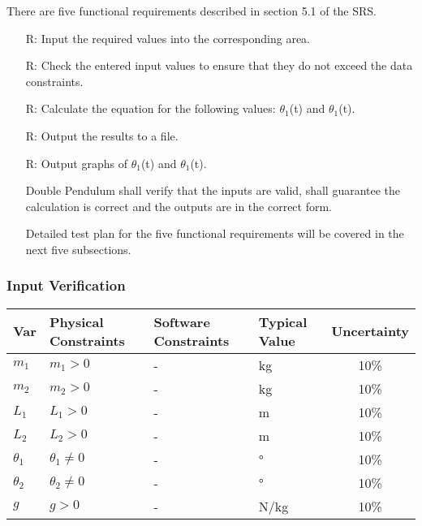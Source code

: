 \documentclass[12pt, titlepage]{article}
\newcounter{reqnum} %
\begin{document}
There are five functional requirements described in section 5.1 of the SRS. 

\noindent \begin{itemize}

\item[R\refstepcounter{reqnum}\thereqnum \label{R_Inputs}:] 
Input the required values into the corresponding area.
\item[R\refstepcounter{reqnum}\thereqnum \label{R_VarifyInputs}:]  
Check the entered input values to ensure that they do not exceed the data constraints.
\item[R\refstepcounter{reqnum}\thereqnum \label{R_Calculate}:] Calculate the equation for the following values: $\theta_1$(t) and $\theta_1$(t).
\item[R\refstepcounter{reqnum}\thereqnum \label{R_Output}:] Output the results to a file.
\item[R\refstepcounter{reqnum}\thereqnum \label{R_Graphs}:] Output graphs of $\theta_1$(t) and $\theta_1$(t).

Double Pendulum shall verify that the inputs are valid, shall guarantee the calculation is correct and the outputs are in the correct form.  

Detailed test plan for the five functional requirements will be covered in the next five subsections.
\end{itemize}

\subsubsection{Input Verification}\label{InputVerif}

\begin{table}[H]
  \caption{Input Variables} \label{TblInputVar}
  \renewcommand{\arraystretch}{1.2}
\noindent \begin{longtable*}{l l l l c} 
  \toprule
  \textbf{Var} & \textbf{Physical Constraints} & \textbf{Software Constraints} &
                             \textbf{Typical Value} & \textbf{Uncertainty}\\
  \midrule 
  $m_1$ & $m_1 > 0$ & - & \si[per-mode=symbol] {\kilogram} & 10\%
  \\
  $m_2$ & $m_2 > 0$ & - & \si[per-mode=symbol] {\kilogram} & 10\%
  \\
  $L_1$ & $L_1 > 0$ & - & \si[per-mode=symbol] {\metre} & 10\%
  \\
  $L_2$ & $L_2 > 0$ & - & \si[per-mode=symbol] {\metre} & 10\%
  \\
  $\theta_1$ & $\theta_1 \neq 0$ & - & \si[per-mode=symbol] {\degree} & 10\%
  \\
  $\theta_2$ & $\theta_2 \neq 0$ & - & \si[per-mode=symbol] {\degree} & 10\%
  \\
  $g$ & $g > 0$ & - & \si[per-mode=symbol] {\newton\per\kilogram} & 10\%
  \\
  \bottomrule
\end{longtable*}
\end{table}
\end{document}
